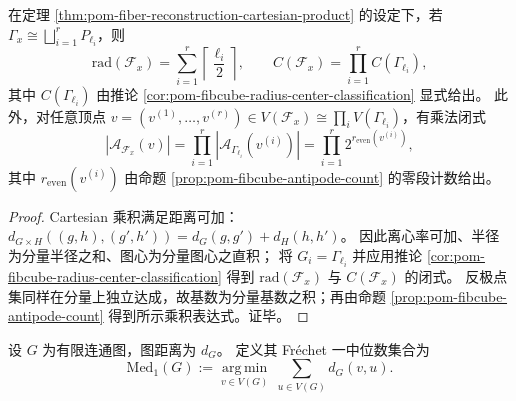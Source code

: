 \begin{theorem}\label{thm:pom-fiber-reconstruction-radius-center-antipodes}
在定理 \ref{thm:pom-fiber-reconstruction-cartesian-product} 的设定下，若 \(\Gamma_x\cong\bigsqcup_{i=1}^r P_{\ell_i}\)，则
\[
\mathrm{rad}(\mathcal{F}_x)=\sum_{i=1}^r \left\lceil\frac{\ell_i}{2}\right\rceil,
\qquad
C(\mathcal{F}_x)=\prod_{i=1}^r C(\Gamma_{\ell_i}),
\]
其中 \(C(\Gamma_{\ell_i})\) 由推论 \ref{cor:pom-fibcube-radius-center-classification} 显式给出。
此外，对任意顶点 \(v=(v^{(1)},\dots,v^{(r)})\in V(\mathcal{F}_x)\cong \prod_i V(\Gamma_{\ell_i})\)，有乘法闭式
\[
|\mathcal{A}_{\mathcal{F}_x}(v)|
=\prod_{i=1}^r |\mathcal{A}_{\Gamma_{\ell_i}}(v^{(i)})|
=\prod_{i=1}^r 2^{r_{\mathrm{even}}(v^{(i)})},
\]
其中 \(r_{\mathrm{even}}(v^{(i)})\) 由命题 \ref{prop:pom-fibcube-antipode-count} 的零段计数给出。
\end{theorem}
\begin{proof}
Cartesian 乘积满足距离可加：
\(
d_{G\times H}((g,h),(g',h'))=d_G(g,g')+d_H(h,h')
\)。
因此离心率可加、半径为分量半径之和、图心为分量图心之直积；
将 \(G_i=\Gamma_{\ell_i}\) 并应用推论 \ref{cor:pom-fibcube-radius-center-classification} 得到 \(\mathrm{rad}(\mathcal{F}_x)\) 与 \(C(\mathcal{F}_x)\) 的闭式。
反极点集同样在分量上独立达成，故基数为分量基数之积；再由命题 \ref{prop:pom-fibcube-antipode-count} 得到所示乘积表达式。证毕。
\end{proof}

\begin{definition}\label{def:pom-frechet-median-graph}
设 \(G\) 为有限连通图，图距离为 \(d_G\)。
定义其 Fr\'echet 一中位数集合为
\[
\mathrm{Med}_1(G):=\operatorname*{arg\,min}_{v\in V(G)}\ \sum_{u\in V(G)} d_G(v,u).
\]
\end{definition}

